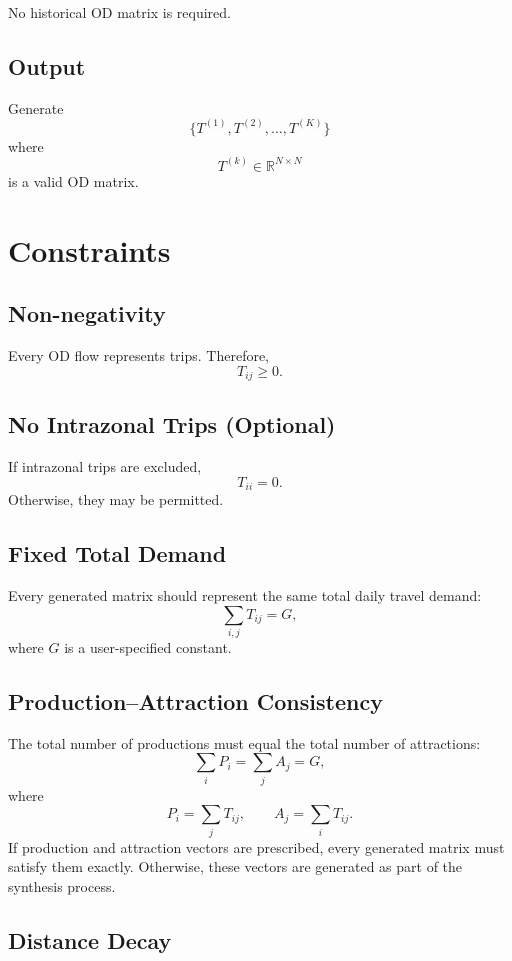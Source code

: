 \documentclass[11pt,a4paper]{article}
\begin{document}
No historical OD matrix is required.

\subsection{Output}

Generate
\[
\{T^{(1)},T^{(2)},\ldots,T^{(K)}\}
\]
where
\[
T^{(k)}\in\mathbb{R}^{N\times N}
\]
is a valid OD matrix.

\section{Constraints}

\subsection{Non-negativity}

Every OD flow represents trips. Therefore,
\[
T_{ij}\ge 0.
\]

\subsection{No Intrazonal Trips (Optional)}

If intrazonal trips are excluded,
\[
T_{ii}=0.
\]
Otherwise, they may be permitted.

\subsection{Fixed Total Demand}

Every generated matrix should represent the same total daily travel demand:
\[
\sum_{i,j}T_{ij}=G,
\]
where $G$ is a user-specified constant.

\subsection{Production--Attraction Consistency}

The total number of productions must equal the total number of attractions:
\[
\sum_i P_i = \sum_j A_j = G,
\]
where
\[
P_i=\sum_j T_{ij}, \qquad A_j=\sum_i T_{ij}.
\]
If production and attraction vectors are prescribed, every generated matrix must satisfy them exactly. Otherwise, these vectors are generated as part of the synthesis process.

\subsection{Distance Decay}
\end{document}
